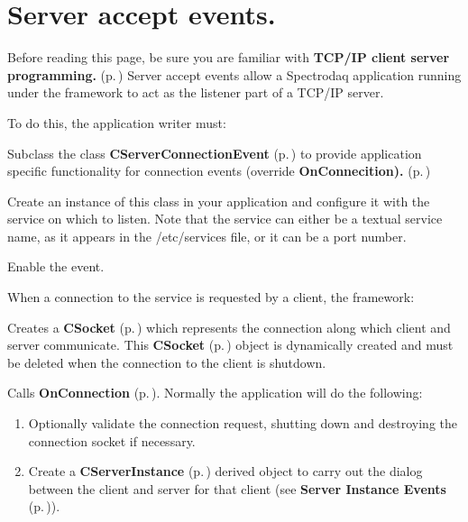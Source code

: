 \section{Server accept events.}\label{ServerEvent}


Before reading this page, be sure you are familiar with {\bf TCP/IP  client server programming.} {\rm (p.\,\pageref{TCPIP})}  Server accept events allow a Spectrodaq application running under the framework to act as the listener part of a TCP/IP server.

To do this, the application writer must:\begin{CompactItemize}
\item 
Subclass the class {\bf CServer\-Connection\-Event} {\rm (p.\,\pageref{classCServerConnectionEvent})} to provide application specific functionality for connection events (override {\bf On\-Connecition).} {\rm (p.\,\pageref{classCServerConnectionEvent_a12})}\item 
Create an instance of this class in your application and configure it with the service on which to listen. Note that the service can either be a textual service name, as it appears in the /etc/services file, or it can be a port number.\item 
Enable the event.\end{CompactItemize}
When a connection to the service is requested by a client, the framework:\begin{CompactItemize}
\item 
Creates a {\bf CSocket} {\rm (p.\,\pageref{classCSocket})} which represents the connection along which client and server communicate. This {\bf CSocket} {\rm (p.\,\pageref{classCSocket})} object is dynamically created and must be deleted when the connection to the client is shutdown.\item 
Calls {\bf On\-Connection} {\rm (p.\,\pageref{classCServerConnectionEvent_a12})}. Normally the application will do the following:\begin{enumerate}
\item 
Optionally validate the connection request, shutting down and destroying the connection socket if necessary.\item 
Create a {\bf CServer\-Instance} {\rm (p.\,\pageref{classCServerInstance})} derived object to carry out the dialog between the client and server for that client (see {\bf Server       Instance Events} {\rm (p.\,\pageref{SocketEvents})}).\end{enumerate}
\end{CompactItemize}
